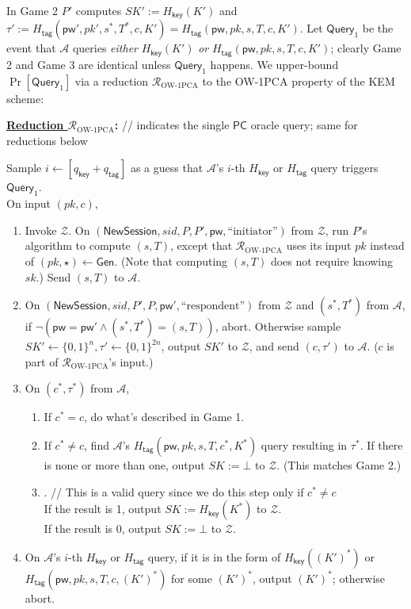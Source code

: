 \documentclass{article}
\theoremstyle{plain}
\theoremstyle{definition}
\theoremstyle{remark}
\newcommand{\adv}{\mathcal{A}}
\newcommand{\env}{\mathcal{Z}}
\newcommand{\red}{\mathcal{R}}
\newcommand{\Gen}{\mathsf{Gen}}
\newcommand{\PC}{\mathsf{PC}}
\newcommand{\Hkey}{H_\mathsf{key}}
\newcommand{\Htag}{H_\mathsf{tag}}
\newcommand{\pw}{\mathsf{pw}}
\newcommand{\NewSession}{\mathsf{NewSession}}
\newcommand{\qkey}{q_\mathsf{key}}
\newcommand{\qtag}{q_\mathsf{tag}}
\newcommand{\Query}{\mathsf{Query}}
\begin{document}
In Game 2 $P'$ computes $SK' := \Hkey(K')$ and $\tau' := \Htag(\pw',pk',s^*,T^*,c,K') \allowbreak = \Htag(\pw,pk,s,T,c,K')$. Let $\Query_1$ be the event that $\adv$ queries \emph{either} $\Hkey(K')$ \emph{or} $\Htag(\pw,pk,s,T,c,K')$; clearly Game 2 and Game 3 are identical unless $\Query_1$ happens. We upper-bound $\Pr[\Query_1]$ via a reduction $\red_\text{OW-1PCA}$ to the OW-1PCA property of the KEM scheme:

\medskip\noindent\textbf{\underline{Reduction $\red_\mathrm{OW\text{-}1PCA}$}:} \quad \textcolor[gray]{0.5}{//  indicates the single $\PC$ oracle query; same for reductions below}

\medskip\noindent
Sample $i \gets [\qkey+\qtag]$ as a guess that $\adv$'s $i$-th $\Hkey$ or $\Htag$ query triggers $\Query_1$. \\
On input $(pk,c)$,
\begin{enumerate}
  \item Invoke $\env$. On $(\NewSession, sid, P, P', \pw, \text{``initiator''})$ from $\env$, run $P$'s algorithm to compute $(s,T)$, except that $\red_\text{OW-1PCA}$ uses its input $pk$ instead of $(pk,\star) \gets \Gen$. (Note that computing $(s,T)$ does not require knowing $sk$.) Send $(s,T)$ to $\adv$.
  \item On $(\NewSession, sid, P', P, \pw', \text{``respondent''})$ from $\env$ and $(s^*,T^*)$ from $\adv$, if $\neg(\pw = \pw' \land (s^*,T^*) = (s,T))$, abort. Otherwise sample $SK' \gets \{0,1\}^n, \tau' \gets \{0,1\}^{2n}$, output $SK'$ to $\env$, and send $(c,\tau')$ to $\adv$. ($c$ is part of $\red_\text{OW-1PCA}$'s input.)
  \item On $(c^*,\tau^*)$ from $\adv$,
      \begin{enumerate}
        \item If $c^* = c$, do what's described in Game 1.
        \item If $c^* \neq c$, find $\adv$'s $\Htag(\pw,pk,s,T,c^*,K^*)$ query resulting in $\tau^*$. If there is none or more than one, output $SK := \bot$ to $\env$. (This matches Game 2.)
        \item \fbox{Query $\PC_{sk}(c^*,K^*)$}. \quad // \textcolor[gray]{0.5}{This is a valid query since we do this step only if $c^* \neq c$} \\
            If the result is 1, output $SK := \Hkey(K^*)$ to $\env$. \\
            If the result is 0, output $SK := \bot$ to $\env$.
      \end{enumerate}
  \item On $\adv$'s $i$-th $\Hkey$ or $\Htag$ query, if it is in the form of $\Hkey((K')^*)$ or $\Htag(\pw,pk,s,T,c,(K')^*)$ for some $(K')^*$, output $(K')^*$; otherwise abort.
\end{enumerate}
\end{document}
